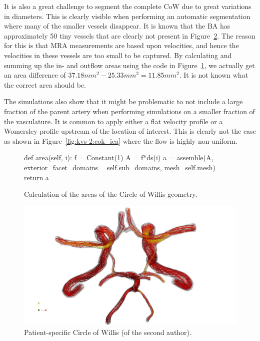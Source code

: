It is also a great challenge to segment the complete CoW due to great
variations in diameters. This is clearly visible when performing an
automatic segmentation where many of the smaller vessels disappear.
It is known that the BA has approximately 50 tiny vessels that are
clearly not present in Figure~\ref{fig:kvs-2:screenshot}. The reason
for this is that MRA measurements are based upon velocities, and hence
the velocities in these vessels are too small to be captured. By
calculating and summing up the in- and outflow areas using the code in
Figure~\ref{fig:kvs-2:area_code}, we actually get an area difference
of $37.18mm^2-25.33mm^2=11.85mm^2$. It is not known what the correct
area should be.

The simulations also show that it might be problematic to not include
a large fraction of the parent artery when performing simulations on a
smaller fraction of the vasculature. It is common to apply either a
flat velocity profile or a Womersley profile upstream of the location
of interest. This is clearly not the case as shown in
Figure~\ref{fig:kvs-2:cok_ica} where the flow is highly non-uniform.

\begin{figure}
  \begin{center}
    \begin{python}
def area(self, i):
    f = Constant(1)
    A = f*ds(i)
    a = assemble(A,
                 exterior_facet_domains=\
                 self.sub_domains,
                 mesh=self.mesh)
    return a
    \end{python}
    \caption{Calculation of the areas of the Circle of Willis geometry.}
    \label{fig:kvs-2:area_code}
  \end{center}
\end{figure}

\begin{figure}
  \begin{center}
    \includegraphics[width=\fullfig]{chapters/kvs-2/pdf/cok_top_steam_white.pdf}
  \end{center}
  \caption{Patient-specific Circle of Willis (of the second author).}
  \label{fig:kvs-2:screenshot}
\end{figure}

